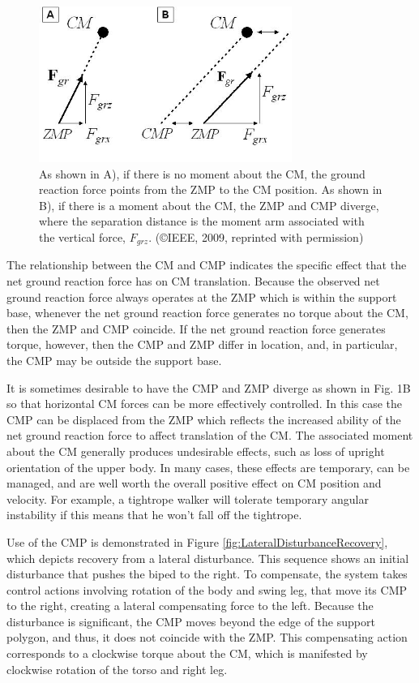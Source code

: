 \documentclass{llncs}
\begin{document}
\begin{figure}[b]
\includegraphics[height=2in]{Fig1}
\caption{As shown in A), if there is no moment about the CM, the ground reaction force points from the ZMP to the CM position.  As shown in  B),  if there is a moment about the CM, the ZMP and CMP diverge, where the separation distance is the moment arm associated with the vertical force, $F_{grz}$.
(\copyright IEEE, 2009, reprinted with permission)}
\label{fig:Fig1}       
\end{figure}

The relationship between the CM and CMP indicates the specific effect that the net ground reaction force has on CM translation. 
Because the observed net ground reaction force always operates at the ZMP which is within the support base, 
whenever the net ground reaction force generates no torque about the CM, then the ZMP and CMP coincide. 
If the net ground reaction force generates torque, however, then the CMP and ZMP differ in location, and, in particular, the CMP may be outside 
the support base. 

It is sometimes desirable to have the CMP and ZMP diverge as shown in Fig. 1B so that horizontal CM forces can be more effectively controlled.  
In this case the CMP can be displaced from the ZMP which reflects the increased ability of the net ground reaction force to 
affect translation of the CM. 
The associated moment about the CM generally produces undesirable effects, such as loss of upright orientation of the upper body.  
In many cases, these effects are temporary, can be managed, and are well worth the overall positive effect on CM position and velocity.  
For example, a tightrope walker will tolerate temporary angular instability if this means that he won’t fall off the tightrope.  

Use of the CMP is demonstrated in Figure \ref{fig:LateralDisturbanceRecovery}, which depicts recovery from a lateral disturbance.  
This sequence shows an initial disturbance that pushes the biped to the right.  
To compensate, the system takes control actions involving rotation of the body and swing leg, that move its CMP to the right, 
creating a lateral compensating force to the left.  
Because the disturbance is significant, the CMP moves beyond the edge of the support polygon, and thus, it does not coincide with the ZMP.  
This compensating action corresponds to a clockwise torque about the CM, which is manifested by clockwise rotation of the torso and right leg.  
\end{document}
